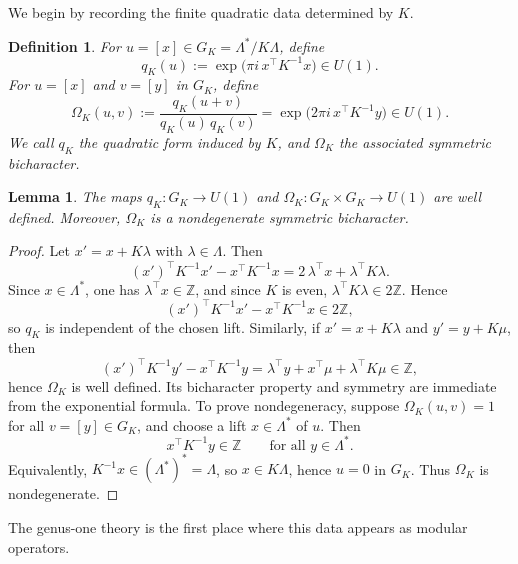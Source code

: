 \documentclass[12pt]{amsart}
\numberwithin{equation}{section}
\newtheorem{lemma}[theorem]{Lemma}
\newtheorem{definition}[theorem]{Definition}
\begin{document}
We begin by recording the finite quadratic data determined by \(K\).

\begin{definition}
For \(u=[x]\in G_K=\Lambda^*/K\Lambda\), define
\[
q_K(u):=\exp\!\bigl(\pi i\,x^{\top}K^{-1}x\bigr)\in U(1).
\]
For \(u=[x]\) and \(v=[y]\) in \(G_K\), define
\[
\Omega_K(u,v)
:=
\frac{q_K(u+v)}{q_K(u)\,q_K(v)}
=
\exp\!\bigl(2\pi i\,x^{\top}K^{-1}y\bigr)\in U(1).
\]
We call \(q_K\) the quadratic form induced by \(K\), and \(\Omega_K\) the associated
symmetric bicharacter.
\end{definition}

\begin{lemma}
The maps \(q_K:G_K\to U(1)\) and \(\Omega_K:G_K\times G_K\to U(1)\) are well defined.
Moreover, \(\Omega_K\) is a nondegenerate symmetric bicharacter.
\end{lemma}

\begin{proof}
Let \(x'=x+K\lambda\) with \(\lambda\in \Lambda\). Then
\[
(x')^{\top}K^{-1}x' - x^{\top}K^{-1}x
=
2\,\lambda^{\top}x + \lambda^{\top}K\lambda.
\]
Since \(x\in \Lambda^*\), one has \(\lambda^{\top}x\in \mathbb Z\), and since \(K\) is even,
\(\lambda^{\top}K\lambda\in 2\mathbb Z\). Hence
\[
(x')^{\top}K^{-1}x' - x^{\top}K^{-1}x \in 2\mathbb Z,
\]
so \(q_K\) is independent of the chosen lift. Similarly, if \(x'=x+K\lambda\) and \(y'=y+K\mu\), then
\[
(x')^{\top}K^{-1}y' - x^{\top}K^{-1}y
=
\lambda^{\top}y + x^{\top}\mu + \lambda^{\top}K\mu \in \mathbb Z,
\]
hence \(\Omega_K\) is well defined. Its bicharacter property and symmetry are immediate
from the exponential formula. To prove nondegeneracy, suppose \(\Omega_K(u,v)=1\) for all \(v=[y]\in G_K\), and choose
a lift \(x\in \Lambda^*\) of \(u\). Then
\[
x^{\top}K^{-1}y\in \mathbb Z
\qquad
\text{for all }y\in \Lambda^*.
\]
Equivalently, \(K^{-1}x\in (\Lambda^*)^*=\Lambda\), so \(x\in K\Lambda\), hence \(u=0\) in
\(G_K\). Thus \(\Omega_K\) is nondegenerate.
\end{proof}

The genus-one theory is the first place where this data appears as modular operators.
\end{document}
